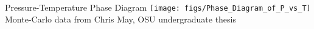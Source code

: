 \documentclass{beamer}
\newcommand*{\diff}{\mathsf{d}}
\begin{document}
\begin{frame}{Pressure-Temperature Phase Diagram}
    \centering
    \texttt{[image: figs/Phase\_Diagram\_of\_P\_vs\_T]}\\
    \small *Monte-Carlo data from Chris May, OSU undergraduate thesis
\end{frame}






\end{document}
